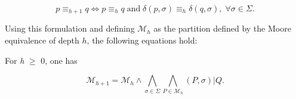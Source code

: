 {\begin{proposition}
\end{proposition}

\begin{equation}\label{eq:mooreequiv}
p \equiv_{h+1} q \Longleftrightarrow p \equiv_{h} q\; \text{and} \;\delta(p,\sigma) \equiv_h \delta(q,\sigma), \; \forall \sigma \in \Sigma.
\end{equation}

\noindent Using this formulation and defining $\mathcal{M}_h$ as the partition defined by the Moore equivalence of depth $h$, the following equations hold:

\begin{proposition}\label{prop:moorecomp}
For \textit{h} $\geq$ 0, one has

\end{proposition}

\begin{equation}\label{eq:mooreequiv}
\mathcal{M}_{h+1} = \mathcal{M}_h \wedge \bigwedge_{\sigma\in\Sigma} \bigwedge_{P\in\mathcal{M}_h}(P,\sigma)|Q.
\end{equation}

}

